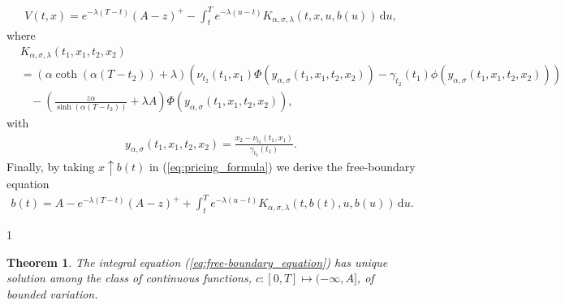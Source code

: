 \documentclass{tufte-handout}
\newtheorem{thm}{Theorem}
\def\uniqtheo{1}
\begin{document}
	\begin{align}\label{eq:pricing_formula}
	V(t, x) = e^{-\lambda (T - t)}(A - z)^+ - \int_{t}^{T}e^{-\lambda (u - t)}K_{\alpha, \sigma, \lambda}(t, x, u, b(u))\,\mathrm{d}u,
	\end{align}
	where
	\begin{align}\label{eq:kernel}
	&K_{\alpha, \sigma, \lambda}(t_1, x_1, t_2, x_2) \nonumber \\
	&=\left(\alpha\coth(\alpha(T - t_2)) + \lambda\right)\left(\nu_{t_2}(t_1, x_1)\Phi\left(y_{\alpha, \sigma}(t_1, x_1, t_2, x_2)\right) - \gamma_{t_2}(t_1)\phi(y_{\alpha, \sigma}(t_1, x_1, t_2, x_2))\right) \nonumber \\
	&\ \ \ \ - \left(\frac{z\alpha}{\sinh(\alpha(T - t_2))} + \lambda A\right)\Phi\left(y_{\alpha, \sigma}(t_1, x_1, t_2, x_2)\right),
	\end{align}
	with
	\begin{align*}
	y_{\alpha, \sigma}(t_1, x_1, t_2, x_2) = \frac{x_2 - \nu_{t_2}(t_1, x_1)}{\gamma_{t_2}(t_1)}.
	\end{align*}
	Finally, by taking $x \uparrow b(t)$ in (\ref{eq:pricing_formula}) we derive the free-boundary equation
	\begin{align}\label{eq:free-boundary_equation}
	b(t) = A - e^{-\lambda (T - t)}(A - z)^+ + \int_{t}^{T}e^{-\lambda (u - t)}K_{\alpha, \sigma, \lambda}(t, b(t), u, b(u))\,\mathrm{d}u.
	\end{align}
	
	\if\uniqtheo1
	\begin{thm}
		The integral equation (\ref{eq:free-boundary_equation}) has unique solution among the class of continuous functions, $c:[0, T]\mapsto (-\infty, A]$, of bounded variation.
	\end{thm}
	
\end{document}
